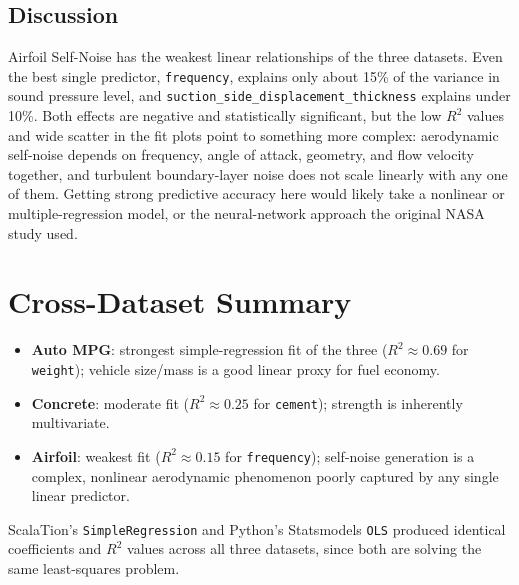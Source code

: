 \documentclass[11pt]{article}
\begin{document}
\subsection{Discussion}
Airfoil Self-Noise has the weakest linear relationships of the three
datasets. Even the best single predictor, \texttt{frequency}, explains only
about 15\% of the variance in sound pressure level, and
\texttt{suction\_side\_displacement\_thickness} explains under 10\%. Both
effects are negative and statistically significant, but the low $R^2$ values
and wide scatter in the fit plots point to something more complex:
aerodynamic self-noise depends on frequency, angle of attack, geometry, and
flow velocity together, and turbulent boundary-layer noise does not scale
linearly with any one of them. Getting strong predictive accuracy here would
likely take a nonlinear or multiple-regression model, or the neural-network
approach the original NASA study used.

\clearpage
\section*{Cross-Dataset Summary}
\begin{itemize}
    \item \textbf{Auto MPG}: strongest simple-regression fit of the three
    ($R^2 \approx 0.69$ for \texttt{weight}); vehicle size/mass is a good
    linear proxy for fuel economy.
    \item \textbf{Concrete}: moderate fit ($R^2 \approx 0.25$ for
    \texttt{cement}); strength is inherently multivariate.
    \item \textbf{Airfoil}: weakest fit ($R^2 \approx 0.15$ for
    \texttt{frequency}); self-noise generation is a complex, nonlinear
    aerodynamic phenomenon poorly captured by any single linear predictor.
\end{itemize}
ScalaTion's \texttt{SimpleRegression} and Python's Statsmodels \texttt{OLS}
produced identical coefficients and $R^2$ values across all three datasets,
since both are solving the same least-squares problem.
\end{document}
